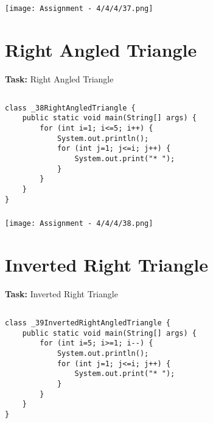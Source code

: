 \documentclass[12pt,a4paper]{article}
\begin{document}
\subsubsection{}
\begin{center}
    \texttt{[image: Assignment - 4/4/4/37.png]}
\end{center}


\section{Right Angled Triangle}
\textbf{Task:} Right Angled Triangle

\subsection{}
\begin{lstlisting}
class _38RightAngledTriangle {
    public static void main(String[] args) {
        for (int i=1; i<=5; i++) {
            System.out.println();
            for (int j=1; j<=i; j++) {
                System.out.print("* ");
            }
        }
    }
}
\end{lstlisting}

\subsubsection{}
\begin{center}
    \texttt{[image: Assignment - 4/4/4/38.png]}
\end{center}


\section{Inverted Right Triangle}
\textbf{Task:} Inverted Right Triangle

\subsection{}
\begin{lstlisting}
class _39InvertedRightAngledTriangle {
    public static void main(String[] args) {
        for (int i=5; i>=1; i--) {
            System.out.println();
            for (int j=1; j<=i; j++) {
                System.out.print("* ");
            }
        }
    }
}
\end{lstlisting}
\end{document}
